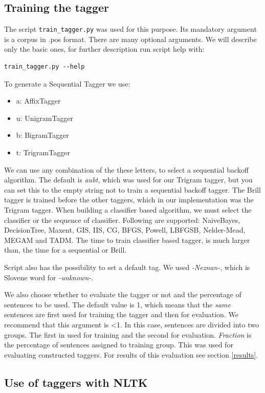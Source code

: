 \documentclass[10pt, conference, compsocconf]{IEEEtran}
\begin{document}
\subsection{Training the tagger} %
The script \texttt{train\_tagger.py} was used for this purpose. Its mandatory argument is a corpus in .pos format. There are many optional arguments. We will describe only the basic ones, for further description run script help with:
\begin{lstlisting}
train_tagger.py --help
\end{lstlisting}
\par
To generate a Sequential Tagger we use:
\begin{itemize}
\item a: AffixTagger
\item u: UnigramTagger
\item b: BigramTagger
\item t: TrigramTagger
\end{itemize}
We can use any combination of the these letters, to select a sequential backoff algorithm.
The default is \textit{aubt}, which was used for our Trigram tagger, but you can set this to the empty string not to train a sequential backoff tagger. The Brill tagger is trained before the other taggers, which in our implementation was the Trigram tagger. When building a classifier based algorithm, we must select the classifier or the sequence of classifier. Following are supported: NaiveBayes, DecisionTree, Maxent, GIS, IIS, CG, BFGS, Powell, LBFGSB, Nelder-Mead, MEGAM and TADM. The time to train classifier based tagger, is much larger than, the time for a sequential or Brill.
\par
Script also has the possibility to set a default tag. We used \textit{-Neznan-}, which is Slovene word for \textit{-unknown-}.
\par
We also choose whether to evaluate the tagger or not and the percentage of sentences to be used. The default value is 1, which means that the \textit{same} sentences are first used for training the tagger and then for evaluation. We recommend that this argument is <1. In this case, sentences are divided into two groups. The first in used for training and the second for evaluation. \textit{Fraction} is the percentage of sentences assigned to training group. 
This was used for evaluating constructed taggers. For results of this evaluation see section \ref{results}.

\subsection{Use of taggers with NLTK} %
\end{document}
